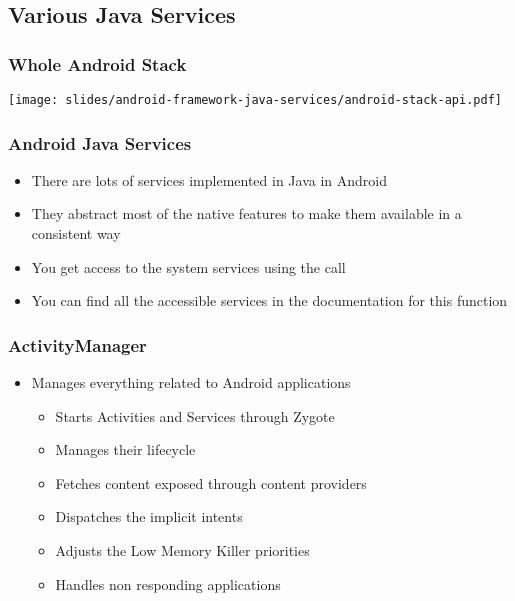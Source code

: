\subsection{Various Java Services}

\begin{frame}
  \frametitle{Whole Android Stack}
  \begin{center}
    \texttt{[image: slides/android-framework-java-services/android-stack-api.pdf]}
  \end{center}
\end{frame}

\begin{frame}

  \frametitle{Android Java Services}
  \begin{itemize}
  \item There are lots of services implemented in Java in Android
  \item They abstract most of the native features to make them
    available in a consistent way
  \item You get access to the system services using the
     call
  \item You can find all the accessible services in the documentation 
    for this function
  \end{itemize}
\end{frame}

\begin{frame}
  \frametitle{ActivityManager}
    \begin{itemize}
    \item Manages everything related to Android applications
      \begin{itemize}
      \item Starts Activities and Services through Zygote
      \item Manages their lifecycle
      \item Fetches content exposed through content providers
      \item Dispatches the implicit intents
      \item Adjusts the Low Memory Killer priorities
      \item Handles non responding applications
      \end{itemize}
  \end{itemize}
\end{frame}

